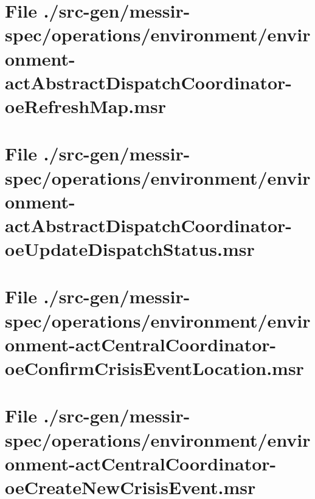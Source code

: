 \section[File /src-gen.../environment-actAbstractDispatchCoordinator-oeRefreshMap.msr]{File ./src-gen/messir-spec/operations/environment/environment-actAbstractDispatchCoordinator-oeRefreshMap.msr}
\scriptsize

\normalsize
	
\section[File /.../environment-actAbstractDispatchCoordinator-oeUpdateDispatchStatus.msr]{File ./src-gen/messir-spec/operations/environment/environment-actAbstractDispatchCoordinator-oeUpdateDispatchStatus.msr}
\scriptsize

\normalsize
	
\section[File /.../environment-actCentralCoordinator-oeConfirmCrisisEventLocation.msr]{File ./src-gen/messir-spec/operations/environment/environment-actCentralCoordinator-oeConfirmCrisisEventLocation.msr}
\scriptsize

\normalsize
	
\section[File /src-gen.../environment-actCentralCoordinator-oeCreateNewCrisisEvent.msr]{File ./src-gen/messir-spec/operations/environment/environment-actCentralCoordinator-oeCreateNewCrisisEvent.msr}
\scriptsize

\normalsize
	
